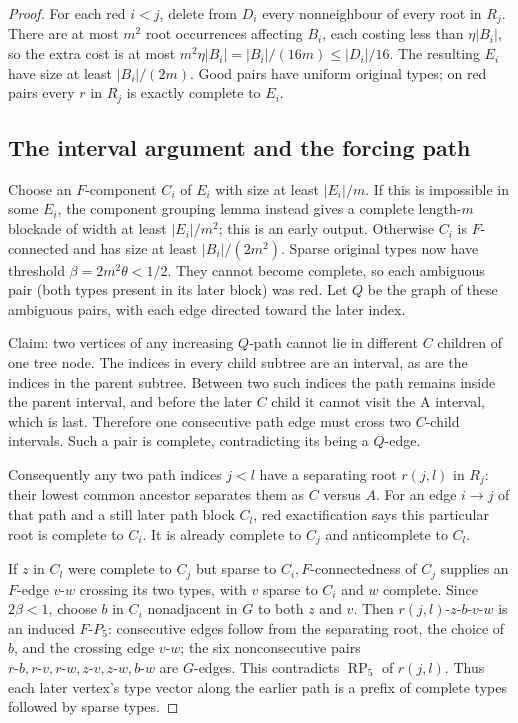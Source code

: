 \documentclass[11pt,a4paper]{article}
\theoremstyle{definition}
\theoremstyle{remark}
\numberwithin{equation}{section}
\begin{document}
\begin{proof}
For each red \(i<j\), delete from \(D_{i}\) every nonneighbour of every root in \(R_{j}\). There are at most \(m^{2}\) root occurrences affecting \(B_{i}\), each costing less than \(\eta|B_{i}|\), so the extra cost is at most \(m^{2} \eta|B_{i}|=|B_{i}|/(16m)\le\allowbreak |D_{i}|/16\). The resulting \(E_{i}\) have size at least \(|B_{i}|/(2m)\). Good pairs have uniform original types; on red pairs every \(r\) in \(R_{j}\) is exactly complete to \(E_{i}\).
\subsection{The interval argument and the forcing path}\label{subsec:rp5-interval}
Choose an \(F\)-component \(C_{i}\) of \(E_{i}\) with size at least \(|E_{i}|/m\). If this is impossible in some \(E_{i}\), the component grouping lemma instead gives a complete length-\(m\) blockade of width at least \(|E_{i}|/m^{2}\); this is an early output. Otherwise \(C_{i}\) is \(F\)-connected and has size at least \(|B_{i}|/(2m^{2})\). Sparse original types now have threshold \(\beta=2m^{2} \theta<1/2\). They cannot become complete, so each ambiguous pair (both types present in its later block) was red. Let \(Q\) be the graph of these ambiguous pairs, with each edge directed toward the later index.

Claim: two vertices of any increasing \(Q\)-path cannot lie in different \(C\) children of one tree node. The indices in every child subtree are an interval, as are the indices in the parent subtree. Between two such indices the path remains inside the parent interval, and before the later \(C\) child it cannot visit the A interval, which is last. Therefore one consecutive path edge must cross two \(C\)-child intervals. Such a pair is complete, contradicting its being a \(Q\)-edge.

Consequently any two path indices \(j<l\) have a separating root \(r(j,\allowbreak l)\) in \(R_{j}\): their lowest common ancestor separates them as \(C\) versus \(A\). For an edge \(i\to j\) of that path and a still later path block \(C_{l}\), red exactification says this particular root is complete to \(C_{i}\). It is already complete to \(C_{j}\) and anticomplete to \(C_{l}\).



If \(z\) in \(C_{l}\) were complete to \(C_{j}\) but sparse to \(C_{i},\allowbreak  F\)-connectedness of \(C_{j}\) supplies an \(F\)-edge \(v\text{-}w\) crossing its two types, with \(v\) sparse to \(C_{i}\) and \(w\) complete. Since \(2\beta<1\), choose \(b\) in \(C_{i}\) nonadjacent in \(G\) to both \(z\) and \(v\). Then \(r(j,\allowbreak l)\text{-}z\text{-}b\text{-}v\text{-}w\) is an induced \(F\text{-}P_{5}\): consecutive edges follow from the separating root, the choice of \(b\), and the crossing edge \(v\text{-}w\); the six nonconsecutive pairs \(r\text{-}b,\allowbreak r\text{-}v,\allowbreak r\text{-}w,\allowbreak z\text{-}v,\allowbreak z\text{-}w,\allowbreak b\text{-}w\) are \(G\)-edges. This contradicts \(\operatorname{RP}_{5}\) of \(r(j,\allowbreak l)\). Thus each later vertex's type vector along the earlier path is a prefix of complete types followed by sparse types.


\end{proof}
\end{document}

